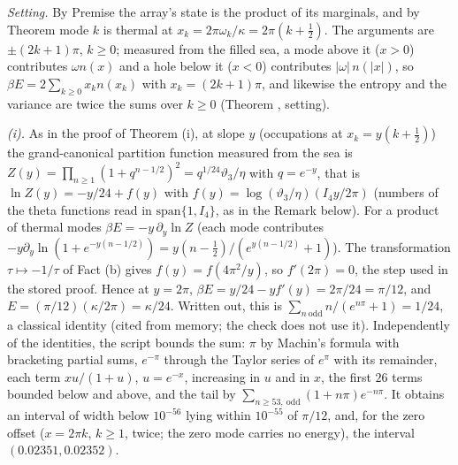 \emph{Setting.} By Premise  the array's state is the product of its marginals, and by Theorem  mode $k$ is thermal at $x_{k} = 2\pi\omega_{k}/\kappa = 2\pi(k + \tfrac12)$. The arguments are $\pm(2k + 1)\pi$, $k \geq 0$; measured from the filled sea, a mode above it ($x > 0$) contributes $\omega n(x)$ and a hole below it ($x < 0$) contributes $|\omega|\,n(|x|)$, so $\beta E = 2\sum_{k \geq 0}x_{k}n(x_{k})$ with $x_{k} = (2k + 1)\pi$, and likewise the entropy and the variance are twice the sums over $k \geq 0$ (Theorem , setting).

\emph{(i).} As in the proof of Theorem (i), at slope $y$ (occupations at $x_{k} = y(k + \tfrac12)$) the grand-canonical partition function measured from the sea is $Z(y) = \prod_{n \geq 1}(1 + q^{n - 1/2})^{2} = q^{1/24}\vartheta_{3}/\eta$ with $q = e^{-y}$, that is $\ln Z(y) = -y/24 + f(y)$ with $f(y) = \log(\vartheta_{3}/\eta)(I_4y/2\pi)$ (numbers of the theta functions read in $\mathrm{span}\{1, I_4\}$, as in the Remark below). For a product of thermal modes $\beta E = -y\,\partial_{y}\ln Z$ (each mode contributes $-y\partial_{y}\ln(1 + e^{-y(n - 1/2)}) = y(n - \tfrac12)/(e^{y(n - 1/2)} + 1)$). The transformation $\tau \mapsto -1/\tau$ of Fact (b) gives $f(y) = f(4\pi^{2}/y)$, so $f'(2\pi) = 0$, the step used in the stored proof. Hence at $y = 2\pi$, $\beta E = y/24 - y f'(y) = 2\pi/24 = \pi/12$, and $E = (\pi/12)(\kappa/2\pi) = \kappa/24$. Written out, this is $\sum_{n\ \mathrm{odd}}n/(e^{n\pi} + 1) = 1/24$, a classical identity (cited from memory; the check does not use it). Independently of the identities, the script bounds the sum: $\pi$ by Machin's formula with bracketing partial sums, $e^{-\pi}$ through the Taylor series of $e^{\pi}$ with its remainder, each term $x u/(1 + u)$, $u = e^{-x}$, increasing in $u$ and in $x$, the first $26$ terms bounded below and above, and the tail by $\sum_{n \geq 53,\ \mathrm{odd}}(1 + n\pi)e^{-n\pi}$. It obtains an interval of width below $10^{-56}$ lying within $10^{-55}$ of $\pi/12$, and, for the zero offset ($x = 2\pi k$, $k \geq 1$, twice; the zero mode carries no energy), the interval $(0.02351, 0.02352)$.

